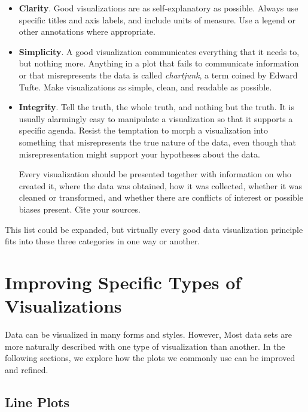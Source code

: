\begin{itemize}
    \item \textbf{Clarity}.
    Good visualizations are as self-explanatory as possible.
    Always use specific titles and axis labels, and include units of measure.
    Use a legend or other annotations where appropriate.

    \item \textbf{Simplicity}.
    A good visualization communicates everything that it needs to, but nothing more.
    Anything in a plot that fails to communicate information or that misrepresents the data is called \emph{chartjunk}, a term coined by Edward Tufte.
    Make visualizations as simple, clean, and readable as possible.

    \item \textbf{Integrity}.
    Tell the truth, the whole truth, and nothing but the truth.
    It is usually alarmingly easy to manipulate a visualization so that it supports a specific agenda.
    Resist the temptation to morph a visualization into something that misrepresents the true nature of the data, even though that misrepresentation might support your hypotheses about the data.

    Every visualization should be presented together with information on who created it, where the data was obtained, how it was collected, whether it was cleaned or transformed, and whether there are conflicts of interest or possible biases present.
    Cite your sources.
\end{itemize}

This list could be expanded, but virtually every good data visualization principle fits into these three categories in one way or another.

\newpage

\section*{Improving Specific Types of Visualizations} %

Data can be visualized in many forms and styles.
However, Most data sets are more naturally described with one type of visualization than another.
In the following sections, we explore how the plots we commonly use can be improved and refined.

\subsection*{Line Plots} %

